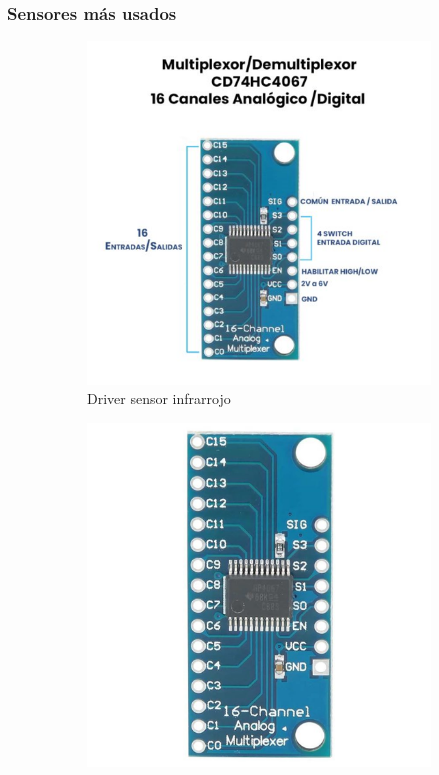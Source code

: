 \documentclass[a4paper,11pt]{report}    %
\begin{document}
\subsubsection{Sensores más usados}
\begin{figure}[H]
    \begin{subfigure}[t]{0.475\textwidth}
        \includegraphics[width=1\textwidth]{img/19.png}
        \caption{Driver sensor infrarrojo}
        \label{subfig:example-image-b}
    \end{subfigure}%
    \hfill
    \begin{subfigure}[t]{0.475\textwidth}
        \includegraphics[width=1\textwidth]{img/20.png}

\end{subfigure}
\end{figure}
\end{document}

